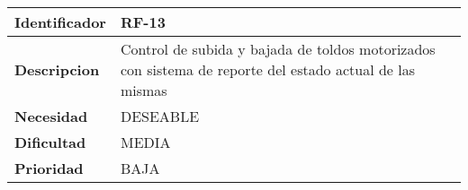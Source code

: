 \begin{center}
    \begin{tabular}{|p{2.6cm}|p{12cm}|}
    \hline
    \textbf{Identificador} & RF-13\\
    \hline
    \textbf{Descripcion} & Control de subida y bajada de toldos motorizados con sistema de reporte del estado actual de las mismas\\
    \hline
    \textbf{Necesidad} & DESEABLE\\
    \hline
    \textbf{Dificultad} & MEDIA\\
    \hline
    \textbf{Prioridad} & BAJA\\
    \hline
    \end{tabular}
\end{center}
